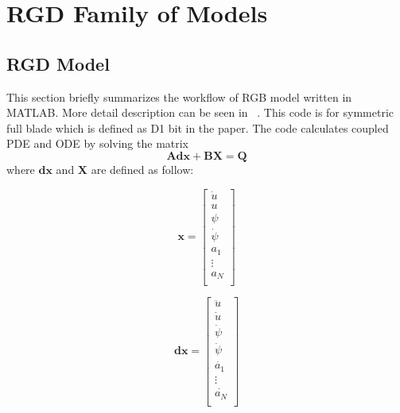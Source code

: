 \chapter{RGD Family of Models}

\section{RGD Model}

This section briefly summarizes the workflow of RGB model written in MATLAB. More detail description can be seen in ~\cite{ref:zhang2020a}.  This code is for symmetric full blade which is defined as D1 bit in the paper.  The code calculates coupled PDE and ODE by solving the matrix
\begin{equation}\label{matrix}
  \bm{Adx} + \bm{BX} = \bm{Q}
\end{equation}
where $\bm{dx}$ and $\bm{X}$ are defined as follow:
\vspace{\abovedisplayskip}

\noindent\begin{minipage}{.4\linewidth}
\begin{equation}
\bm{x}=
\begin{bmatrix}
\dot{u} \\
u \\
\psi \\
\dot{\psi} \\
a_1\ \\
\vdots \\
a_N \\
\end{bmatrix}
\end{equation}
\end{minipage}%
\hfill
\begin{minipage}{.4\linewidth}
\begin{equation}
\bm{dx}=
\begin{bmatrix}
\ddot{u} \\
\dot{u} \\
\dot{\psi} \\
\ddot{\psi} \\
\dot{a_1}\ \\
\vdots \\
\dot{a_N} \\
\end{bmatrix}
\end{equation}
\end{minipage}
\vspace{\belowdisplayskip}

